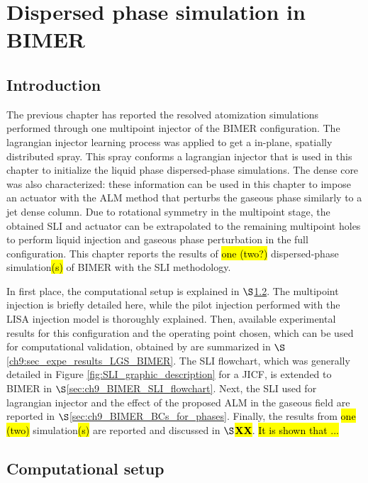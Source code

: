\chapter{Dispersed phase simulation in BIMER}
	\label{ch9:BIMER_lagrangian}

\section{Introduction}

The previous chapter has reported the resolved atomization simulations performed through one multipoint injector of the BIMER configuration. The lagrangian injector learning process was applied to get a in-plane, spatially distributed spray. This spray conforms a lagrangian injector that is used in this chapter to initialize the liquid phase dispersed-phase simulations. The dense core was also characterized: these information can be used in this chapter to impose an actuator with the ALM method that perturbs the gaseous phase similarly to a jet dense column. Due to rotational symmetry in the multipoint stage, the obtained SLI and actuator can be extrapolated to the remaining multipoint holes to perform liquid injection and gaseous phase perturbation in the full configuration. This chapter reports the results of \hl{one (two?)} dispersed-phase simulation\hl{(s)} of BIMER with the SLI methodology.

In first place, the computational setup is explained in $\S$\ref{ch9:sec_computations_setup}. The multipoint injection is briefly detailed here, while the pilot injection performed with the LISA injection model is thoroughly explained. Then, available experimental results for this configuration and the operating point chosen, which can be used for computational validation, obtained by  are summarized in $\S$\ref{ch9:sec_expe_results_LGS_BIMER}. The SLI flowchart, which was generally detailed in Figure \ref{fig:SLI_graphic_description} for a JICF, is extended to BIMER in $\S$\ref{sec:ch9_BIMER_SLI_flowchart}. Next, the SLI used for lagrangian injector and the effect of the proposed ALM in the gaseous field are reported in $\S$\ref{sec:ch9_BIMER_BCs_for_phases}. Finally, the results from \hl{one (two)}  simulation\hl{(s)} are reported and discussed in $\S$\hl{\textbf{XX}}. \hl{It is shown that ...}





\section{Computational setup}
\label{ch9:sec_computations_setup}


